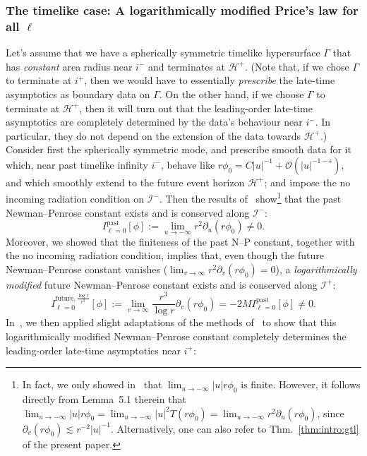 \documentclass[11pt,english]{article}
\numberwithin{equation}{section}
\theoremstyle{remark}
\theoremstyle{plain}
\theoremstyle{remark}
\newcommand{\pu}{\partial_u}
\newcommand{\pv}{\partial_v}
\renewcommand{\O}{\mathcal{O}}
\renewcommand{\(}{\left(}
\renewcommand{\)}{\right)}
\newcommand{\ILpn}[1]{I_{\ell=#1}^{\mathrm{past}}}
\begin{document}
\subsubsection{The timelike case: A logarithmically modified Price's law for all \texorpdfstring{$\ell$}{L}}\label{intro:subsecNP1}
Let's assume that we have a spherically symmetric timelike hypersurface $\Gamma$ that has \textit{constant} area radius near $i^-$ and terminates at $\mathcal{H}^+$. 
(Note that, if we chose $\Gamma$ to terminate at $i^+$, then we would have to essentially \textit{prescribe} the late-time asymptotics as boundary data on $\Gamma$. 
On the other hand, if we choose $\Gamma$ to terminate at $\mathcal H^+$, then it will turn out that the leading-order late-time asymptotics are completely determined by the data's behaviour near $i^-$. In particular, they do not depend on the extension of the data towards $\mathcal H^+$.)
Consider first the spherically symmetric mode, and prescribe smooth data for it which, near past timelike infinity $i^-$, behave like $r\phi_0=C|u|^{-1}+\O(|u|^{-1-\epsilon})$, and which smoothly extend to the future event horizon $\mathcal{H}^+$; and impose the no incoming radiation condition on $\mathcal I^-$. 
Then the results of~\cite{I} show\footnote{In fact, we only showed in~\cite{I} that $\lim_{u\to-\infty}|u| r\phi_0$ is finite. However, it follows directly from Lemma~5.1 therein that $\lim_{u\to-\infty}|u| r\phi_0=\lim_{u\to-\infty}|u|^2 T(r\phi_0)=\lim_{u\to-\infty}r^2\pu(r\phi_0)$, since $\pv(r\phi_0)\lesssim r^{-2}|u|^{-1}$. Alternatively, one can also refer to Thm.~\ref{thm:intro:gtl} of the present paper.} that the past Newman--Penrose constant exists and is conserved along $\mathcal{I}^-$:
\begin{equation}
\ILpn0[\phi]:=\lim_{u\to -\infty} r^2\pu(r\phi_0)\neq 0.
\end{equation}
Moreover, we showed that the finiteness of the past N--P constant, together with the no incoming radiation condition, implies that, even though the future Newman--Penrose constant vanishes ($\lim_{v\to\infty} r^2 \pv(r\phi_0)=0$), a \textit{logarithmically modified} future Newman--Penrose constant exists and is conserved along $\mathcal{I}^+$:
\begin{equation}
I_{\ell=0}^{ \mathrm{future},\frac{\log r}{r^3}}[\phi]:=\lim_{v\to\infty} \frac{r^3}{\log r} \pv(r\phi_0)=-2MI_{\ell=0}^{\mathrm{past}}[\phi]\neq 0.
\end{equation}
In~\cite{II}, we then applied slight adaptations of the methods of~\cite{AAG18b} to show that this logarithmically modified Newman--Penrose constant completely determines the leading-order late-time asymptotics near $i^+$:
\end{document}
